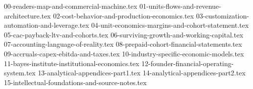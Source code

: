
{00-readers-map-and-commercial-machine.tex}
{01-units-flows-and-revenue-architecture.tex}
{02-cost-behavior-and-production-economics.tex}
{03-customization-automation-and-leverage.tex}
{04-unit-economics-margins-and-cohort-statement.tex}
{05-cac-payback-ltv-and-cohorts.tex}
{06-surviving-growth-and-working-capital.tex}
{07-accounting-language-of-reality.tex}
{08-prepaid-cohort-financial-statements.tex}
{09-accruals-capex-ebitda-and-taxes.tex}
{10-industry-specific-economic-models.tex}
{11-bayes-institute-institutional-economics.tex}
{12-founder-financial-operating-system.tex}
{13-analytical-appendices-part1.tex}
{14-analytical-appendices-part2.tex}
{15-intellectual-foundations-and-source-notes.tex}
